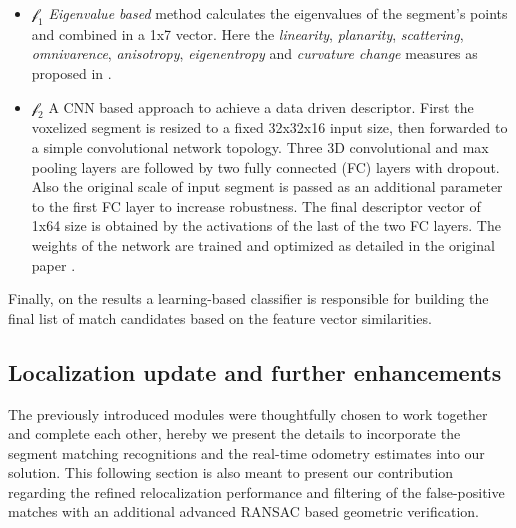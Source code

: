 \documentclass[letterpaper, 10 pt, conference]{ieeeconf}  %
\begin{document}
\begin{itemize}
    \item $\mathscr{f}_1$ \textit{Eigenvalue based} method calculates the eigenvalues of the segment's points and combined in a 1x7 vector. Here  the \textit{linearity}, \textit{planarity}, \textit{scattering}, \textit{omnivarence}, \textit{anisotropy}, \textit{eigenentropy} and \textit{curvature change} measures as proposed in \cite{eigen_features}. 
    \item $\mathscr{f}_2$ A CNN based approach to achieve a data driven descriptor. First the voxelized segment is resized to a fixed 32x32x16 input size, then forwarded to a simple convolutional network topology. Three 3D convolutional and max pooling layers are followed by two fully connected (FC) layers with dropout. Also the original scale of input segment is passed as an additional parameter to the first FC layer to increase robustness. The final descriptor vector of 1x64 size is obtained by the activations of the last of the two FC layers. The weights of the network are trained and optimized as detailed in the original paper \cite{segmap}. 
\end{itemize}


Finally, on the results a learning-based classifier is responsible for building the final list of match candidates based on the feature vector similarities. 

\subsection{Localization update and further enhancements}\label{our_contribution}

The previously introduced modules were thoughtfully chosen to work together and complete each other, hereby we present the details to incorporate the segment matching recognitions and the real-time odometry estimates into our solution. 
This following section is also meant to present our contribution regarding the refined relocalization performance and filtering of the false-positive matches with an additional advanced RANSAC based geometric verification. 
\end{document}
